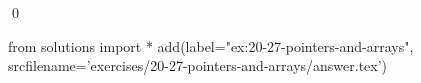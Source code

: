 
\begin{ex}
  \label{ex:20-27-pointers-and-arrays}
  
  \qed
\end{ex}
\begin{python0}
from solutions import *
add(label="ex:20-27-pointers-and-arrays",
    srcfilename='exercises/20-27-pointers-and-arrays/answer.tex')
\end{python0}
